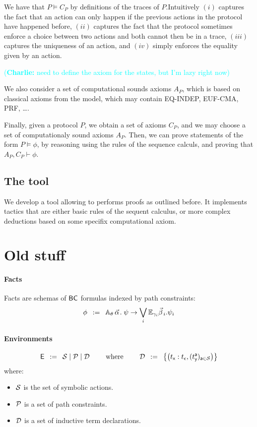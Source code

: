 \documentclass[a4paper]{article}
\theoremstyle{remark}
\newcommand{\charlie}[1]{\textcolor{cyan}{(\textbf{Charlie:} #1)}}
\begin{document}
We have that $ P\models C_P$ by definitions of the traces of $P$.Intuitively $(i)$ captures the fact that an action can only happen if the previous actions in the protocol have happened before, $(ii)$ captures the fact that the protocol sometimes enforce a choice between two actions and both cannot then be in a trace, $(iii)$ captures the uniqueness of an action, and $(iv)$ simply enforces the equality given by an action.

\charlie{need to define the axiom for the states, but I'm lazy right now}


We also consider a set of computational sounds axioms $A_P$, which is based on classical axioms from the \BC model, which may contain EQ-INDEP, EUF-CMA, PRF, \dots.

Finally, given a protocol $P$, we obtain a set of axioms $C_P$, and we may choose a set of computationaly sound axioms $A_P$.
Then, we can prove statements of the form $ P \models \phi$, by reasoning using the rules of the sequence calculs, and proving that $A_P,C_P \vdash \phi$.

\subsection{The tool}

We develop a tool allowing to performs proofs as outlined before. It implements tactics that are either basic rules of the sequent calculus, or more complex deductions based on some specifix computational axiom.







\newpage
\section{Old stuff}



\paragraph{Facts}
Facts are schemas of $\textsf{BC}$ formulas indexed by path constraints:
\[
  \phi \mdef
  \cforall_\theta\, \valpha.\;
  \psi
  \ra
  \bigvee_{i}
  \cexists_\gammai \vbetai. \psi_i
\]

\paragraph{Environments}
\[
  \textsf{E} \;\;\mathbin{:=}\;\;
  \mathcal{S} \mid
  \mathcal{P} \mid
  \mathcal{D}
  \qquad
  \text{ where }
  \qquad
  \mathcal{D} \;\;\mathbin{:=}\;\;
  \left\{
    \left(t_{\textsf{x}} : t_\epsilon,(t_{\textsf{y}}^{\textsf{a}})_{{\textsf{a}} \in \mathcal{S}}\right)
  \right\}
\]
where:
\begin{itemize}
\item $\mathcal{S}$ is the set of symbolic actions.
\item $\mathcal{P}$ is a set of path constraints.
\item $\mathcal{D}$ is a set of inductive term declarations.
\end{itemize}
\end{document}
